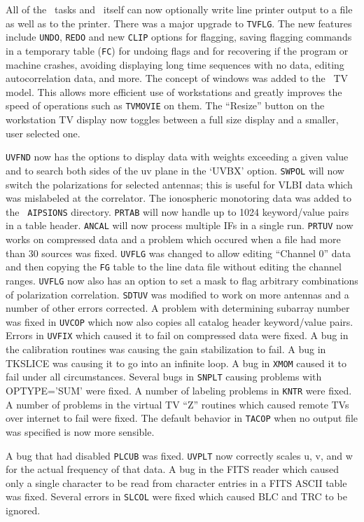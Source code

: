 All of the \AIPS\ tasks and \AIPS\ itself can now optionally write
line printer output to a file as well as to the printer.  There was a
major upgrade to {\tt TVFLG}.  The new features include {\tt UNDO},
{\tt REDO} and new {\tt CLIP} options for flagging, saving flagging
commands in a temporary table ({\tt FC}) for undoing flags and for
recovering if the program or machine crashes, avoiding displaying long
time sequences with no data, editing autocorrelation data, and more.
The concept of windows was added to the \AIPS\ TV model.  This allows
more efficient use of workstations and greatly improves the speed of
operations such as {\tt TVMOVIE} on them.  The ``Resize'' button on
the workstation TV display now toggles between a full size display and
a smaller, user selected one.

{\tt UVFND} now has the options to display data with weights exceeding
a given value and to search both sides of the uv plane in the `UVBX'
option.  {\tt SWPOL} will now switch the polarizations for selected
antennas; this is useful for VLBI data which was mislabeled at the
correlator.  The ionospheric monotoring data was added to the {\tt
AIPSIONS} directory.  {\tt PRTAB} will now handle up
to 1024 keyword/value pairs in a table header.  {\tt ANCAL} will now
process multiple IFs in a single run.  {\tt PRTUV} now works on
compressed data and a problem which occured when a file had more than
30 sources was fixed.  {\tt UVFLG} was changed to allow editing
``Channel 0'' data and then copying the {\tt FG} table to the line
data file without editing the channel ranges.  {\tt UVFLG} now also
has an option to set a mask to flag arbitrary combinations of
polarization correlation.  {\tt SDTUV} was modified to work on more
antennas and a number of other errors corrected.  A problem with
determining subarray number was fixed in {\tt UVCOP} which now
also copies all catalog header keyword/value pairs.
Errors in {\tt UVFIX} which caused it to fail on compressed data were
fixed.  A bug
in the calibration routines was causing the gain stabilization to
fail.  A bug in TKSLICE was causing it to go into an infinite loop.  A
bug in {\tt XMOM} caused it to fail under all circumstances.  Several
bugs in {\tt SNPLT} causing problems with OPTYPE='SUM' were fixed.  A
number of labeling problems in {\tt KNTR} were fixed.  A number of
problems in the virtual TV ``Z'' routines which caused remote TVs over
internet to fail were fixed.  The default behavior in {\tt TACOP} when
no output file was specified is now more sensible.

   A bug that had disabled {\tt PLCUB} was fixed. {\tt UVPLT} now
correctly scales u, v, and w for the actual frequency of that data.  A
bug in the FITS reader which caused only a single character to be read
from character entries in a FITS ASCII table was fixed.  Several
errors in {\tt SLCOL} were fixed which caused BLC and TRC to be
ignored.

